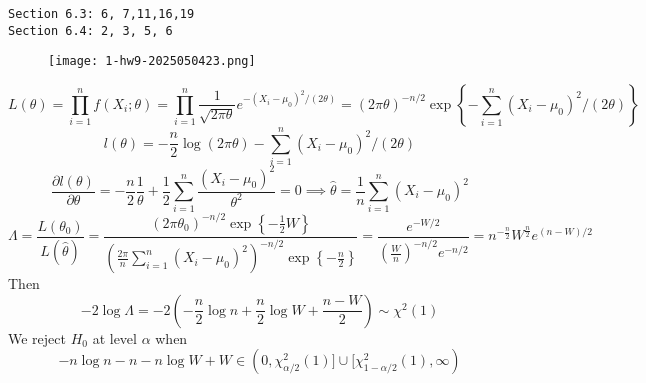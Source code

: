 \begin{lstlisting}
Section 6.3: 6, 7,11,16,19
Section 6.4: 2, 3, 5, 6
\end{lstlisting}
\begin{exercise}
\begin{figure}[H]
\centering
\texttt{[image: 1-hw9-2025050423.png]}
\label{}
\end{figure}
\end{exercise}
\[
L(\theta)=\prod_{i=1}^{n} f(X_i;\theta)=\prod_{i=1}^{n} \frac{1}{\sqrt{ 2\pi\theta }}e^{ -(X_i-\mu_0)^2/(2\theta) }=(2\pi\theta)^{-n/2}\exp \left\{  -\sum_{i=1}^{n} (X_i-\mu_0)^2/(2\theta)  \right\}
\]
\[
l(\theta)=-\frac{n}{2}\log(2\pi\theta)-\sum_{i=1}^{n} (X_i-\mu_0)^2/(2\theta)
\]
\[
\frac{ \partial l(\theta) }{ \partial \theta } =-\frac{n}{2}\frac{1}{\theta}+\frac{1}{2}\sum_{i=1}^{n} \frac{(X_i-\mu_0)^2}{\theta^{2}}=0\implies \widehat{\theta}=\frac{1}{n}\sum_{i=1}^{n} (X_i-\mu_0)^2
\]
\[
\Lambda=\frac{L(\theta_0)}{L(\widehat{\theta})}=\frac{(2\pi \theta_0)^{-n/2 }\exp \left\{  -\frac{1}{2}W  \right\}}{\left( \frac{2\pi}{n}\sum_{i=1}^{n}(X_i-\mu_0)^2  \right)^{-n/2}\exp \left\{  -\frac{n}{2}  \right\}}=\frac{e^{ -W/2  }}{\left( \frac{W}{n} \right)^{-n/2 }e^{ -n/2 }}=n^{-\frac{n}{2}}W^{\frac{n}{2}}e^{ (n-W)/2 }
\]
Then
\[
-2\log\Lambda=-2\left( -\frac{n}{2}\log n+\frac{n}{2}\log W+\frac{n-W}{2} \right)\sim \chi^{2}(1)
\]
We reject $H_0$ at level $\alpha$ when
\begin{equation}
-n\log n-n-n\log W+W\in(0,\chi^{2}_{\alpha/2 }(1)]\cup[\chi^{2}_{1-\alpha/2 }(1),\infty)
\label{49c1a0}
\end{equation}

